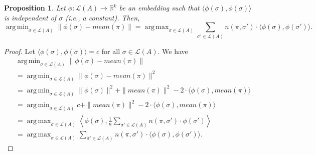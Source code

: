 \documentclass[10pt,letterpaper]{article}
\newcommand{\calL}{{\mathcal{L}}}
\newcommand{\rank}{{\calL(A)}}
\DeclareMathOperator*{\argmax}{arg\,max}
\DeclareMathOperator*{\argmin}{arg\,min}
\newtheorem{proposition}{Proposition}
\begin{document}
\begin{proposition}
Let $\phi : \rank \rightarrow \mathbb{R}^k$ be an embedding such that $\langle \phi(\sigma),\phi(\sigma) \rangle$ is independent of $\sigma$ (i.e., a constant). Then,
$$
\argmin_{\sigma \in \rank} \|\phi(\sigma)-mean(\pi)\| = \argmax_{\sigma \in \rank} \sum_{\sigma' \in \rank} n(\pi,\sigma') \cdot \langle \phi(\sigma),\phi(\sigma') \rangle.
$$
\label{prop:equiv-dist-inner-product}
\end{proposition}
\begin{proof}
Let $\langle \phi(\sigma),\phi(\sigma) \rangle = c$ for all $\sigma \in \rank$. We have
\begin{align*}
&\argmin_{\sigma \in \rank} \|\phi(\sigma)-mean(\pi)\| \\
&= \argmin_{\sigma \in \rank} \|\phi(\sigma)-mean(\pi)\|^2 \\
&= \argmin_{\sigma \in \rank} \|\phi(\sigma)\|^2 + \|mean(\pi)\|^2 - 2 \cdot \langle \phi(\sigma),mean(\pi) \rangle  \\
&= \argmin_{\sigma \in \rank} c+\|mean(\pi)\|^2 - 2 \cdot \langle \phi(\sigma), mean(\pi) \rangle \\
&= \argmax_{\sigma \in \rank} \left\langle \phi(\sigma), \frac{1}{n} \sum_{\sigma' \in \rank} n(\pi,\sigma') \cdot \phi(\sigma') \right\rangle \\
&= \argmax_{\sigma \in \rank} \sum_{\sigma' \in \rank} n(\pi,\sigma') \cdot \langle \phi(\sigma),\phi(\sigma') \rangle. 
\end{align*}
\end{proof}
\end{document}

